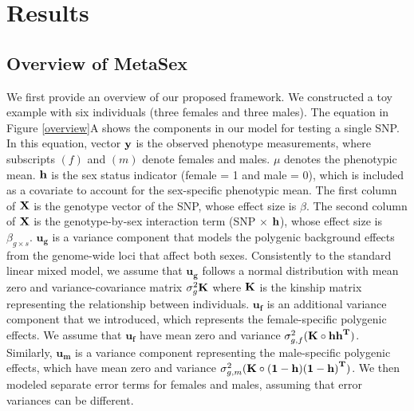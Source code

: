 \documentclass[11pt]{article}
\begin{document}
\section{Results}
\subsection{Overview of MetaSex}


We first provide an overview of our proposed framework.
We constructed a toy example  
with six individuals (three females and three males).
The equation in Figure \ref{overview}A shows the components in our model for testing a single SNP. 
In this equation, vector $\bf{y}$ is the observed phenotype measurements, where 
subscripts $(f)$ and $(m)$ denote females and males.
$\mu$ denotes the phenotypic mean. 
${\bf h}$ is the sex status indicator (female = 1 and male = 0),
which is included as a covariate to account for the sex-specific phenotypic mean. 
The first column of $\bf{X}$ is the genotype vector of the SNP, whose effect size is $\beta$.
The second column of $\bf{X}$ is the 
genotype-by-sex interaction term (SNP $\times$ $\bf{h}$), 
whose effect size is $\beta_{g \times s}$.
$\mathbf{u_g}$ is a variance component that models the polygenic background effects from the genome-wide loci that affect both sexes.
Consistently to the standard linear mixed model\citep{Kang2010,Kang:2008bx,Zhou:NatGenet:2012}, 
we assume that $\mathbf{u_g}$ follows a normal distribution with mean zero and variance-covariance
matrix $\sigma_g^2 \bf{K}$ where $\bf{K}$ is the kinship matrix representing the relationship between individuals.
$\mathbf{u_{f}}$ is an additional variance component that we introduced, which represents the
female-specific polygenic effects.
We assume that $\mathbf{u_{f}}$ have mean zero and variance
$\sigma_{g,f}^2 (\bf{K}\circ \bf{hh}^T)$.
Similarly, $\mathbf{u_{m}}$ is a variance component representing the male-specific
polygenic effects,
which have mean zero and variance
$\sigma_{g,m}^2 (\bf{K}\circ \bf{(1-h)(1-h)}^T)$.
We then modeled separate error terms for females and males, assuming that error variances can be different.
\end{document}
